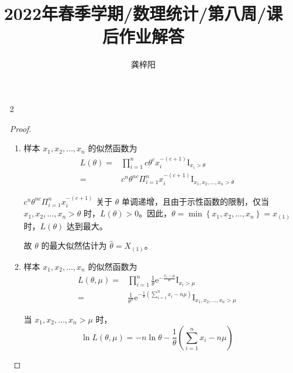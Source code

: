 \documentclass[normal,cn]{elegantnote}
\title{2022年春季学期/数理统计/第八周/课后作业解答}
\author{龚梓阳}
\date{\zhtoday}
\begin{document}
\maketitle
\begin{enumerate}
    \item[2]
        \begin{proof}
            \begin{enumerate}
                \item
                      样本 $x_{1},x_{2},\ldots,x_{n}$ 的似然函数为
                      \begin{equation*}
                          \begin{aligned}
                              L(\theta)= & \prod_{i=1}^{n}c\theta^{c}x_{i}^{-(c+1)}\mathrm{I}_{x_{i}>\theta}                       \\
                              =          & c^{n}\theta^{nc}\Pi_{i=1}^{n}x_{i}^{-(c+1)}\mathrm{I}_{x_{1},x_{2},\ldots,x_{n}>\theta}
                          \end{aligned}
                      \end{equation*}

                      $c^{n}\theta^{nc}\Pi_{i=1}^{n}x_{i}^{-(c+1)}$ 关于 $\theta$ 单调递增，且由于示性函数的限制，仅当 $x_{1},x_{2},\ldots,x_{n}>\theta$ 时，$L(\theta)>0$。因此，$\theta=\min\left\{x_{1},x_{2},\ldots,x_{n}\right\}=x_{(1)}$ 时，$L(\theta)$ 达到最大。

                      故 $\theta$ 的最大似然估计为 $\hat{\theta}=X_{(1)}$。
                \item
                      样本 $x_{1},x_{2},\ldots,x_{n}$ 的似然函数为
                      \begin{equation*}
                          \begin{aligned}
                              L(\theta,\mu)= & \prod_{i=1}^{n}\frac{1}{\theta}\mathrm{e}^{-\frac{x_{i}-\mu}{\theta}}\mathrm{I}_{x_{i}>\mu}                                      \\
                              =              & \frac{1}{\theta^{n}}\mathrm{e}^{-\frac{1}{\theta}\left(\sum_{i=1}^{n}x_{i}-n\mu\right)}\mathrm{I}_{x_{1},x_{2},\ldots,x_{n}>\mu}
                          \end{aligned}
                      \end{equation*}

                      当 $x_{1},x_{2},\ldots,x_{n}>\mu$ 时，
                      \begin{equation*}
                          \ln L(\theta,\mu)=-n\ln\theta-\frac{1}{\theta}\left(\sum_{i=1}^{n}x_{i}-n\mu\right)
                      \end{equation*}


\end{enumerate}
\end{proof}
\end{enumerate}
\end{document}
